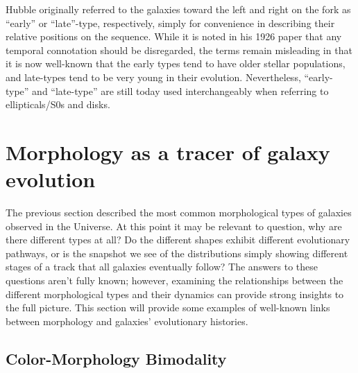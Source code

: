 Hubble originally referred to the galaxies toward the left and right on the fork as ``early'' or ``late''-type, respectively, simply for convenience in describing their relative positions on the sequence. While it is noted in his 1926 paper that any temporal connotation should be disregarded, the terms remain misleading in that it is now well-known that the early types tend to have older stellar populations, and late-types tend to be very young in their evolution. Nevertheless, ``early-type'' and ``late-type'' are still today used interchangeably when referring to ellipticals/S0s and disks. 

\section{Morphology as a tracer of galaxy evolution}

The previous section described the most common morphological types of galaxies observed in the Universe. At this point it may be relevant to question, why are there different types at all? Do the different shapes exhibit different evolutionary pathways, or is the snapshot we see of the distributions simply showing different stages of a track that all galaxies eventually follow? The answers to these questions aren't fully known; however, examining the relationships between the different morphological types and their dynamics can provide strong insights to the full picture. This section will provide some examples of well-known links between morphology and galaxies' evolutionary histories.

\subsection{Color-Morphology Bimodality}

